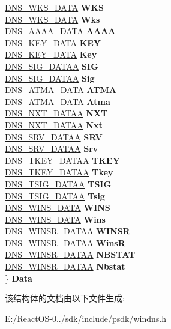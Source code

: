 \begin{DoxyCompactItemize}
\begin{tabbing}
\>\hyperlink{struct_d_n_s___w_k_s___d_a_t_a}{DNS\_WKS\_DATA} {\bfseries WKS}\\
\>\hyperlink{struct_d_n_s___w_k_s___d_a_t_a}{DNS\_WKS\_DATA} {\bfseries Wks}\\
\>\hyperlink{struct_d_n_s___a_a_a_a___d_a_t_a}{DNS\_AAAA\_DATA} {\bfseries AAAA}\\
\>\hyperlink{struct_d_n_s___k_e_y___d_a_t_a}{DNS\_KEY\_DATA} {\bfseries KEY}\\
\>\hyperlink{struct_d_n_s___k_e_y___d_a_t_a}{DNS\_KEY\_DATA} {\bfseries Key}\\
\>\hyperlink{struct_d_n_s___s_i_g___d_a_t_a_a}{DNS\_SIG\_DATAA} {\bfseries SIG}\\
\>\hyperlink{struct_d_n_s___s_i_g___d_a_t_a_a}{DNS\_SIG\_DATAA} {\bfseries Sig}\\
\>\hyperlink{struct_d_n_s___a_t_m_a___d_a_t_a}{DNS\_ATMA\_DATA} {\bfseries ATMA}\\
\>\hyperlink{struct_d_n_s___a_t_m_a___d_a_t_a}{DNS\_ATMA\_DATA} {\bfseries Atma}\\
\>\hyperlink{struct_d_n_s___n_x_t___d_a_t_a_a}{DNS\_NXT\_DATAA} {\bfseries NXT}\\
\>\hyperlink{struct_d_n_s___n_x_t___d_a_t_a_a}{DNS\_NXT\_DATAA} {\bfseries Nxt}\\
\>\hyperlink{struct_d_n_s___s_r_v___d_a_t_a_a}{DNS\_SRV\_DATAA} {\bfseries SRV}\\
\>\hyperlink{struct_d_n_s___s_r_v___d_a_t_a_a}{DNS\_SRV\_DATAA} {\bfseries Srv}\\
\>\hyperlink{struct_d_n_s___t_k_e_y___d_a_t_a_a}{DNS\_TKEY\_DATAA} {\bfseries TKEY}\\
\>\hyperlink{struct_d_n_s___t_k_e_y___d_a_t_a_a}{DNS\_TKEY\_DATAA} {\bfseries Tkey}\\
\>\hyperlink{struct_d_n_s___t_s_i_g___d_a_t_a_a}{DNS\_TSIG\_DATAA} {\bfseries TSIG}\\
\>\hyperlink{struct_d_n_s___t_s_i_g___d_a_t_a_a}{DNS\_TSIG\_DATAA} {\bfseries Tsig}\\
\>\hyperlink{struct_d_n_s___w_i_n_s___d_a_t_a}{DNS\_WINS\_DATA} {\bfseries WINS}\\
\>\hyperlink{struct_d_n_s___w_i_n_s___d_a_t_a}{DNS\_WINS\_DATA} {\bfseries Wins}\\
\>\hyperlink{struct_d_n_s___w_i_n_s_r___d_a_t_a_a}{DNS\_WINSR\_DATAA} {\bfseries WINSR}\\
\>\hyperlink{struct_d_n_s___w_i_n_s_r___d_a_t_a_a}{DNS\_WINSR\_DATAA} {\bfseries WinsR}\\
\>\hyperlink{struct_d_n_s___w_i_n_s_r___d_a_t_a_a}{DNS\_WINSR\_DATAA} {\bfseries NBSTAT}\\
\>\hyperlink{struct_d_n_s___w_i_n_s_r___d_a_t_a_a}{DNS\_WINSR\_DATAA} {\bfseries Nbstat}\\
\} {\bfseries Data}\\

\end{tabbing}\end{DoxyCompactItemize}


该结构体的文档由以下文件生成\+:\begin{DoxyCompactItemize}
\item 
E\+:/\+React\+O\+S-\/0../sdk/include/psdk/windns.\+h\end{DoxyCompactItemize}
